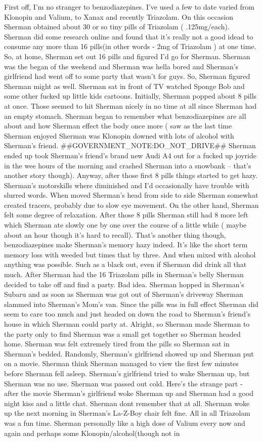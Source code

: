 \documentclass[12pt]{book}
\begin{document}
First off, I'm no stranger to benzodiazepines. I've used a few to date varied from Klonopin and Valium, to Xanax and recently Triazolam. On this occasion Sherman obtained about 30 or so tiny pills of Triazolam ( .125mg/each). Sherman did some research online and found that it's really not a good idead to consume any more than 16 pills(in other words - 2mg of Triazolam ) at one time. So, at home, Sherman set out 16 pills and figured I'd go for Sherman. Sherman was the began of the weekend and Sherman was hella bored and Sherman's girlfriend had went off to some party that wasn't for guys. So, Sherman figured Sherman might as well. Sherman sat in front of TV watched Sponge Bob and some other fucked up little kids cartoons. Initially, Sherman popped about 8 pills at once. Those seemed to hit Sherman nicely in no time at all since Sherman had an empty stomach. Sherman began to remember what benzodiazepines are all about and how Sherman effect the body once more ( saw as the last time Sherman enjoyed Sherman was Klonopin downed with lots of alcohol with Sherman's friend. \#\#GOVERNMENT\_NOTE:DO\_NOT\_DRIVE\#\# Sherman ended up took Sherman's friend's brand new Audi A4 out for a fucked up joyride in the wee hours of the morning and crashed Sherman into a snowbank -- that's another story though). Anyway, after those first 8 pills things started to get hazy. Sherman's motorskills where diminished and I'd occasionally have trouble with slurred words. When moved Sherman's head from side to side Sherman somewhat created tracers, probably due to slow eye movement. On the other hand, Sherman felt some degree of relaxation. After those 8 pills Sherman still had 8 more left which Sherman ate slowly one by one over the course of a little while ( maybe about an hour though it's hard to recall). That's another thing though, benzodiazepines make Sherman's memory hazy indeed. It's like the short term memory loss with weeded but times that by three. And when mixed with alcohol anything was possible. Such as a black out, even if Sherman did drink all that much. After Sherman had the 16 Triazolam pills in Sherman's belly Sherman decided to take off and find a party. Bad idea. Sherman hopped in Sherman's Subaru and as soon as Sherman was got out of Sherman's driveway Sherman slammed into Sherman's Mom's van. Since the pills was in full effect Sherman did seem to care too much and just headed on down the road to Sherman's friend's house in which Sherman could party at. Alright, so Sherman made Sherman to the party only to find Sherman was a small get together so Sherman headed home. Sherman was felt extremely tired from the pills so Sherman sat in Sherman's bedded. Randomly, Sherman's girlfriend showed up and Sherman put on a movie. Sherman think Sherman managed to view the first few minutes before Sherman fell asleep. Sherman's girlfriend tried to wake Sherman up, but Sherman was no use. Sherman was passed out cold. Here's the strange part - after the movie Sherman's girlfriend woke Sherman up and Sherman had a good night kiss and a little chat. Sherman dont remember that at all. Sherman woke up the next morning in Sherman's La-Z-Boy chair felt fine. All in all Triazolam was a fun time. Sherman personally like a high dose of Valium every now and again and perhaps some Klonopin/alcohol(though not in 
\end{document}
